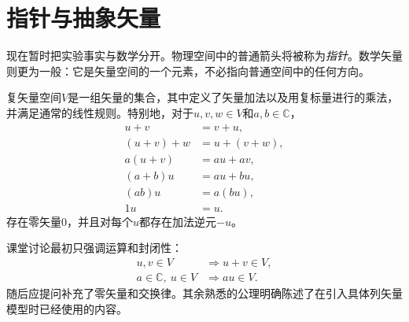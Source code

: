\begin{classroomqa}
\end{classroomqa}

\begin{classroomqa}
\end{classroomqa}

\begin{classroomqa}
\end{classroomqa}

\section{指针与抽象矢量}

现在暂时把实验事实与数学分开。物理空间中的普通箭头将被称为\emph{指针}。数学矢量则更为一般：它是矢量空间的一个元素，不必指向普通空间中的任何方向。

\begin{definition}
复矢量空间\(V\)是一组矢量的集合，其中定义了矢量加法以及用复标量进行的乘法，并满足通常的线性规则。特别地，对于\(u,v,w\in V\)和\(a,b\in\mathbb C\)，
\begin{align}
  u+v&=v+u,\\
  (u+v)+w&=u+(v+w),\\
  a(u+v)&=au+av,\\
  (a+b)u&=au+bu,\\
  (ab)u&=a(bu),\\
  1u&=u.
\end{align}
存在零矢量\(0\)，并且对每个\(u\)都存在加法逆元\(-u\)。
\end{definition}

课堂讨论最初只强调运算和封闭性：
\begin{equation}
\begin{aligned}
  u,v\in V&\Longrightarrow u+v\in V,\\
  a\in\mathbb C,\ u\in V&\Longrightarrow au\in V.
\end{aligned}
\end{equation}
随后应提问补充了零矢量和交换律。其余熟悉的公理明确陈述了在引入具体列矢量模型时已经使用的内容。

